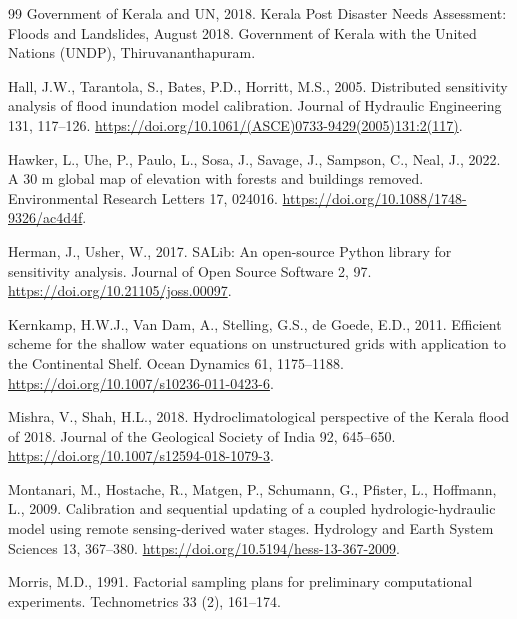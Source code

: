 \documentclass[preprint,12pt,authoryear]{elsarticle}
\begin{document}
\begin{thebibliography}{99}
Government of Kerala and UN, 2018. Kerala Post Disaster Needs Assessment: Floods and Landslides, August 2018. Government of Kerala with the United Nations (UNDP), Thiruvananthapuram.

Hall, J.W., Tarantola, S., Bates, P.D., Horritt, M.S., 2005. Distributed sensitivity analysis of flood inundation model calibration. Journal of Hydraulic Engineering 131, 117--126. \url{https://doi.org/10.1061/(ASCE)0733-9429(2005)131:2(117)}.

Hawker, L., Uhe, P., Paulo, L., Sosa, J., Savage, J., Sampson, C., Neal, J., 2022. A 30 m global map of elevation with forests and buildings removed. Environmental Research Letters 17, 024016. \url{https://doi.org/10.1088/1748-9326/ac4d4f}.

Herman, J., Usher, W., 2017. {SALib}: An open-source Python library for sensitivity analysis. Journal of Open Source Software 2, 97. \url{https://doi.org/10.21105/joss.00097}.

Kernkamp, H.W.J., Van Dam, A., Stelling, G.S., de Goede, E.D., 2011. Efficient scheme for the shallow water equations on unstructured grids with application to the Continental Shelf. Ocean Dynamics 61, 1175--1188. \url{https://doi.org/10.1007/s10236-011-0423-6}.

Mishra, V., Shah, H.L., 2018. Hydroclimatological perspective of the Kerala flood of 2018. Journal of the Geological Society of India 92, 645--650. \url{https://doi.org/10.1007/s12594-018-1079-3}.

Montanari, M., Hostache, R., Matgen, P., Schumann, G., Pfister, L., Hoffmann, L., 2009. Calibration and sequential updating of a coupled hydrologic-hydraulic model using remote sensing-derived water stages. Hydrology and Earth System Sciences 13, 367--380. \url{https://doi.org/10.5194/hess-13-367-2009}.

Morris, M.D., 1991. Factorial sampling plans for preliminary computational experiments. Technometrics 33 (2), 161--174.


\end{thebibliography}
\end{document}
